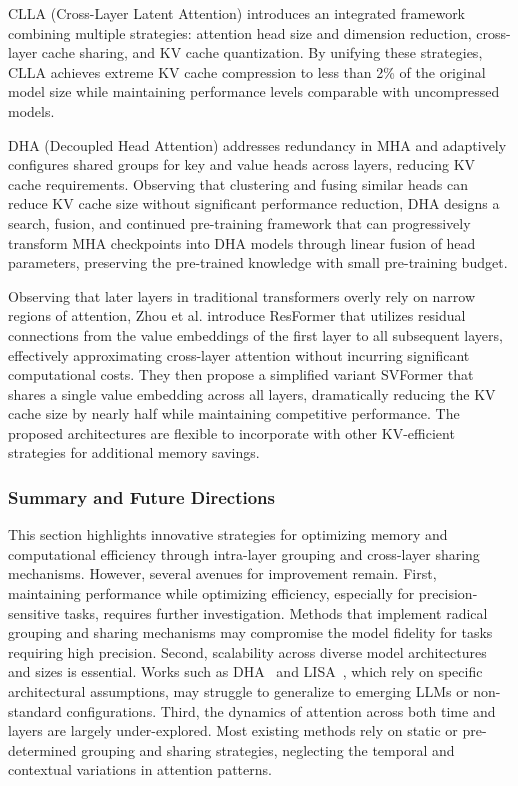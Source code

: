 CLLA (Cross-Layer Latent Attention) \cite{yangLosslessKVCache2024} introduces an integrated framework combining multiple strategies: attention head size and dimension reduction, cross-layer cache sharing, and KV cache quantization. By unifying these strategies, CLLA achieves extreme KV cache compression to less than 2\% of the original model size while maintaining performance levels comparable with uncompressed models.

DHA (Decoupled Head Attention) \cite{chenDHALearningDecoupledHead2024} addresses redundancy in MHA and adaptively configures shared groups for key and value heads across layers, reducing KV cache requirements. Observing that clustering and fusing similar heads can reduce KV cache size without significant performance reduction, DHA designs a search, fusion, and continued pre-training framework that can progressively transform MHA checkpoints into DHA models through linear fusion of head parameters, preserving the pre-trained knowledge with small pre-training budget.

Observing that later layers in traditional transformers overly rely on narrow regions of attention, Zhou et al. \cite{zhouValueResidualLearning2024} introduce ResFormer that utilizes residual connections from the value embeddings of the first layer to all subsequent layers, effectively approximating cross-layer attention without incurring significant computational costs. They then propose a simplified variant SVFormer that shares a single value embedding across all layers, dramatically reducing the KV cache size by nearly half while maintaining competitive performance. The proposed architectures are flexible to incorporate with other KV-efficient strategies for additional memory savings. 

\subsubsection{Summary and Future Directions} 
This section highlights innovative strategies for optimizing memory and computational efficiency through intra-layer grouping and cross-layer sharing mechanisms. However, several avenues for improvement remain. First, maintaining performance while optimizing efficiency, especially for precision-sensitive tasks, requires further investigation. Methods that implement radical grouping and sharing mechanisms may compromise the model fidelity for tasks requiring high precision. Second, scalability across diverse model architectures and sizes is essential. Works such as DHA~\cite{chenDHALearningDecoupledHead2024} and LISA~\cite{muCrosslayerAttentionSharing2024}, which rely on specific architectural assumptions, may struggle to generalize to emerging LLMs or non-standard configurations. Third, the dynamics of attention across both time and layers are largely under-explored. Most existing methods rely on static or pre-determined grouping and sharing strategies, neglecting the temporal and contextual variations in attention patterns.

